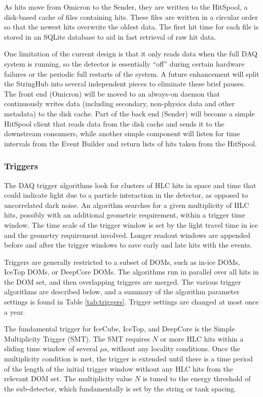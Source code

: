 As hits move from Omicron to the Sender, they are written to the
HitSpool, a disk-based cache of files containing hits.  These files are
written in a circular order so that the newest hits overwrite the oldest
data.  The first hit time for each file is stored in an SQLite database to
aid in fast retrieval of raw hit data.

One limitation of the current design is that it only reads data when
the full DAQ system is running, so the detector is essentially ``off''
during certain hardware failures or the periodic full restarts of the system.
A future enhancement 
will split the StringHub into several independent pieces to eliminate these
brief pauses.  The front end (Omicron) will be moved to an always-on daemon
that continuously writes data (including secondary, non-physics data and
other metadata) to the disk cache.  Part of the back end (Sender) 
will become a simple HitSpool client that reads data from the disk cache
and sends it to the downstream consumers, while another simple component
will listen for time intervals from the Event Builder and return lists of
hits taken from the HitSpool.

\subsubsection{\label{sect:online:trigger}Triggers}

The DAQ trigger algorithms look for clusters of HLC hits in space and time
that could indicate light due to a particle interaction in the detector, as
opposed to uncorrelated dark noise.   An algorithm searches for a given
multiplicity of HLC hits, possibly with an additional geometric
requirement, within a trigger time window.  The time scale of the trigger window is
set by the light travel time in ice and the geometry requirement
involved. Longer readout windows are appended before and after the trigger
windows to save early and late hits with the events.

Triggers are generally restricted to a subset of DOMs, such as in-ice DOMs,
IceTop DOMs, or DeepCore DOMs.  The algorithms run in parallel over all
hits in the DOM set, and then overlapping triggers are merged.  The various
trigger algorithms are described below, and a summary of the algorithm
parameter settings is found in Table \ref{tab:triggers}.  Trigger settings
are changed at most once a year.

The fundamental trigger for IceCube, IceTop, and DeepCore is the Simple
Multiplicity Trigger (SMT).  The SMT requires $N$ or more HLC hits within a
sliding time window of several $\mu\mathrm{s}$, without any locality
conditions.  Once the multiplicity condition is met, the trigger is 
extended until there is a time period of the length of the initial trigger
window without any HLC hits from the relevant DOM set.  The
multiplicity value $N$ is tuned to the energy threshold of the sub-detector,
which fundamentally is set by the string or tank spacing.

